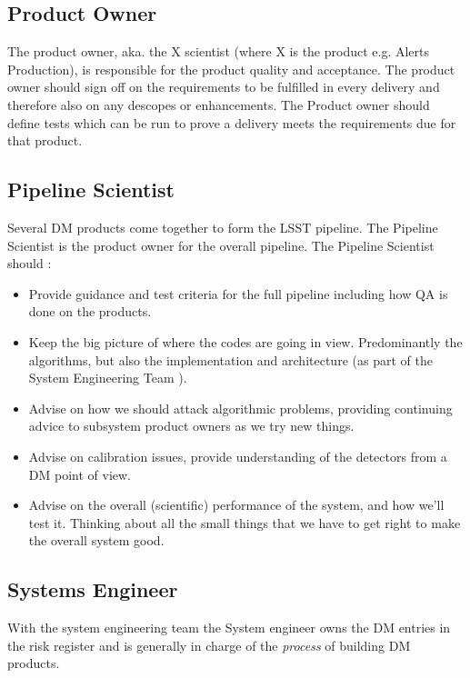 \subsection{Product Owner \label{role:prodo}}

The product owner, aka. the X scientist (where X is the product e.g. Alerts Production), is responsible for the product quality and acceptance.
The product owner should sign off on the requirements to be fulfilled in every delivery and therefore also on any descopes or enhancements.
The Product owner should define tests which can be run to prove a delivery meets the requirements due for that product.

\subsection{Pipeline Scientist \label{role:pipe}}
Several DM products come together to form the LSST pipeline. The Pipeline Scientist is the product owner for the overall pipeline. 
The Pipeline Scientist should :
\begin{itemize}
\item  Provide guidance and test criteria for the full pipeline including how QA is done on the products.  
\item Keep the big picture of where the codes are going in view. Predominantly the algorithms, but also the implementation and architecture (as part of the System Engineering Team ).


\item Advise on how we should attack algorithmic problems,  
providing continuing advice to subsystem product owners as we try new things. 

\item Advise on calibration issues, provide understanding of the detectors from a DM point of view. 

\item Advise on the overall (scientific) performance of the system, and how we'll test it.  Thinking about all the small things that we have to get right to make the overall system good.



\end{itemize}


\subsection{Systems Engineer \label{role:sysengineer}}
With the system engineering team  
 the System engineer 
 owns the DM entries in the risk register and is generally in charge of the {\em process} of building DM products. 

